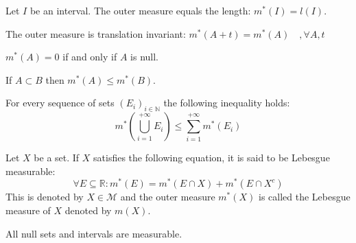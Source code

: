         
        \begin{property}
			Let $I$ be an interval. The outer measure equals the length: $m^*(I) = l(I)$.
		\end{property}
        \begin{property}
			The outer measure is translation invariant: $m^*(A + t) = m^*(A)\quad,\forall A,t$
		\end{property}
        \begin{property}
			$m^*(A) = 0$ if and only if $A$ is null.
		\end{property}
        \begin{property}
			If $A\subset B$ then $m^*(A)\leq m^*(B)$.
		\end{property}
        \begin{property}
        	For every sequence of sets $(E_i)_{i\in\mathbb{N}}$ the following inequality holds: 
			\begin{equation}
				m^*\left(\bigcup_{i=1}^{+\infty}E_i\right) \leq \sum_{i=1}^{+\infty}m^*(E_i)
			\end{equation}
		\end{property}
        
        \begin{theorem}
        	Let $X$ be a set. If $X$ satisfies the following equation, it is said to be Lebesgue measurable:
            \begin{equation}
				\label{lebesgue:lebesgue_measure}
                \forall E\subseteq\mathbb{R}:m^*(E) = m^*(E\cap X) + m^*(E\cap X^c)
			\end{equation}
            This is denoted by $X\in\mathcal{M}$ and the outer measure $m^*(X)$ is called the Lebesgue measure of $X$ denoted by $m(X)$.
        \end{theorem}
        \begin{property}
			All null sets and intervals are measurable.
		\end{property}
        
